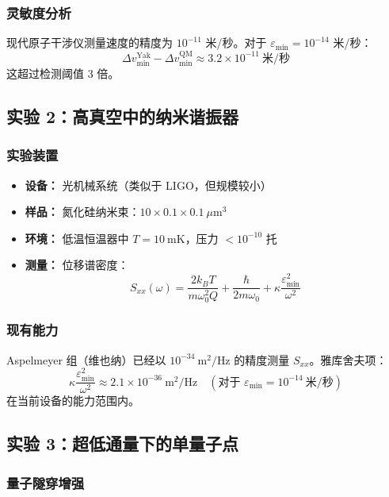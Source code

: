 \documentclass[11pt,a4paper]{article}
\begin{document}
	\subsubsection{灵敏度分析}
	
	现代原子干涉仪测量速度的精度为 $10^{-11}$ 米/秒。对于 $\varepsilon_{\min} = 10^{-14}$ 米/秒：
	\[
	\Delta v_{\min}^{\text{Yak}} - \Delta v_{\min}^{\text{QM}} \approx 3.2 \times 10^{-11}\ \text{米/秒}
	\]
	这超过检测阈值 3 倍。
	
	\subsection{实验 2：高真空中的纳米谐振器}
	
	\subsubsection{实验装置}
	
	\begin{itemize}
		\item \textbf{设备：} 光机械系统（类似于 LIGO，但规模较小）
		\item \textbf{样品：} 氮化硅纳米束：$10 \times 0.1 \times 0.1\ \mu\text{m}^3$
		\item \textbf{环境：} 低温恒温器中 $T = 10\ \text{mK}$，压力 $< 10^{-10}$ 托
		\item \textbf{测量：} 位移谱密度：
		\[
		S_{xx}(\omega) = \frac{2k_B T}{m\omega_0^2 Q} + \frac{\hbar}{2m\omega_0} + \kappa\frac{\varepsilon_{\min}^2}{\omega^2}
		\]
	\end{itemize}
	
	\subsubsection{现有能力}
	
	Aspelmeyer 组（维也纳）已经以 $10^{-34}\ \text{m}^2/\text{Hz}$ 的精度测量 $S_{xx}$。雅库舍夫项：
	\[
	\kappa\frac{\varepsilon_{\min}^2}{\omega^2} \approx 2.1 \times 10^{-36}\ \text{m}^2/\text{Hz} \quad (\text{对于 } \varepsilon_{\min} = 10^{-14}\ \text{米/秒})
	\]
	在当前设备的能力范围内。
	
	\subsection{实验 3：超低通量下的单量子点}
	
	\subsubsection{量子隧穿增强}
	
\end{document}
